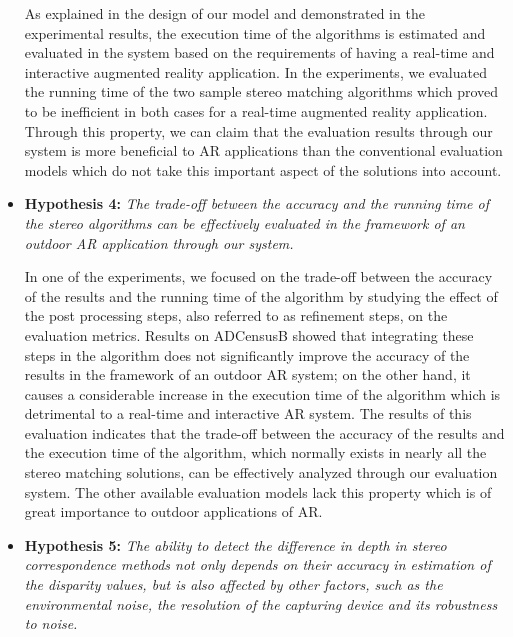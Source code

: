 \begin{itemize}
As explained in the design of our model and demonstrated in the experimental results, the execution time of the algorithms 
is estimated and evaluated in the system based on the requirements of having a real-time and interactive augmented reality application.
In the experiments, we evaluated the running time of the two sample stereo matching algorithms which proved to be inefficient in both cases for 
a real-time augmented reality application. Through this property, we can claim that the evaluation results through our system is more beneficial to AR applications
than the conventional evaluation models which do not take this important aspect of the solutions into account.

\item \textbf{Hypothesis 4:} \emph{The trade-off between the accuracy and the running time of the stereo algorithms can be effectively evaluated 
in the framework of an outdoor AR application through our system.} 

In one of the experiments, we focused on the trade-off between the accuracy of the results and the running time of the algorithm by studying the effect
of the post processing steps, also referred to as refinement steps, on the evaluation metrics. Results on ADCensusB showed that integrating these steps in the algorithm
does not significantly improve the accuracy of the results in the framework of an outdoor AR system; on the other hand, it causes a considerable increase in the execution
time of the algorithm which is detrimental to a real-time and interactive AR system. The results of this evaluation indicates that the trade-off between the accuracy 
of the results and the execution time of the algorithm, which normally exists in nearly all the stereo matching solutions, can be effectively analyzed 
through our evaluation system. The other available evaluation models lack this property which is of great importance to outdoor applications of AR.

\item \textbf{Hypothesis 5:} \emph{The ability to detect the difference in depth in stereo correspondence methods not only depends on their accuracy
in estimation of the disparity values, but is also affected by other factors, such as the environmental noise, the resolution of the capturing device and its
robustness to noise.}


\end{itemize}
